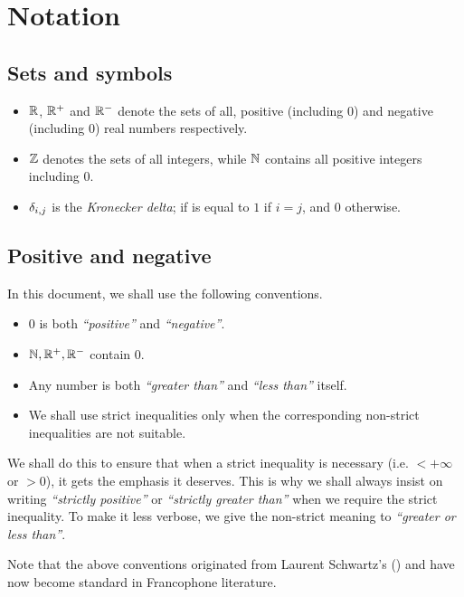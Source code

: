 \chapter*{Notation}

\section*{Sets and symbols}

\begin{itemize}
    \item $\mathbb{R}$, $\mathbb{R}^+$ and $\mathbb{R}^-$ denote the sets of all, positive (including $0$) and negative (including $0$) real numbers respectively.
    \item $\mathbb{Z}$ denotes the sets of all integers,
        while $\mathbb{N}$ contains all positive integers including $0$.
    \item $\delta_{i,j}$ is the \emph{Kronecker delta};
        if is equal to $1$ if $i = j$,
        and $0$ otherwise.
\end{itemize}

\section*{Positive and negative}

In this document, we shall use the following conventions.

\begin{itemize}
    \item $0$ is both \emph{``positive''} and \emph{``negative''}.
    \item $\mathbb{N}, \mathbb{R}^+, \mathbb{R}^-$ contain $0$.
    \item Any number is both \emph{``greater than''} and \emph{``less than''} itself.
    \item We shall use strict inequalities only
        when the corresponding non-strict inequalities are not suitable.
\end{itemize}

We shall do this to ensure that
when a strict inequality is necessary (i.e. $< +\infty$ or $> 0$),
it gets the emphasis it deserves.
This is why we shall always insist on writing \emph{``strictly positive''} or \emph{``strictly greater than''} when we require the strict inequality.
To make it less verbose,
we give the non-strict meaning to \emph{``greater or less than''}.

Note that the above conventions originated from Laurent Schwartz's  (\cite{Schwartz1981})
and have now become standard in Francophone literature.

